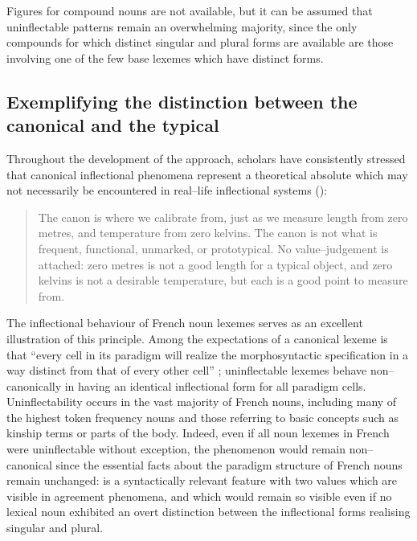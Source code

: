 \documentclass[output=paper,colorlinks,citecolor=brown]{langscibook}
\begin{document}
Figures for compound nouns are not available, but it can be assumed that uninflectable patterns remain an overwhelming majority, since the only compounds for which distinct singular and plural forms are available are those involving one of the few base lexemes which have distinct forms.

\subsection{Exemplifying the distinction between the canonical and the typical}

Throughout the development of the  approach, scholars have consistently stressed that canonical inflectional phenomena represent a theoretical absolute which may not necessarily be encountered in real--life inflectional systems (\citealt{corbett2007, corbett2009, corbett2023, brownchumakina2013, corbettfedden2016, audring2019, bond2019}):

\begin{quote}
	The canon is where we calibrate from, just as we measure length from zero metres, and temperature from zero kelvins. The canon is not what is frequent, functional, unmarked, or prototypical. No value--judgement is attached: zero metres is not a good length for a typical object, and zero kelvins is not a desirable temperature, but each is a good point to measure from.
	
	\hfill \citep[188]{corbett2023}
\end{quote}

The inflectional behaviour of French noun lexemes serves as an excellent illustration of this principle. Among the expectations of a canonical lexeme is that ``every cell in its paradigm will realize the morphosyntactic specification in a way distinct from that of every other cell'' \citep[2]{corbett2009}; uninflectable lexemes behave non--canonically in having an identical inflectional form for all paradigm cells. Uninflectability occurs in the vast majority of French nouns, including many of the highest token frequency nouns and those referring to basic concepts such as kinship terms or parts of the body. Indeed, even if all noun lexemes in French were uninflectable without exception, the phenomenon would remain non--canonical since the essential facts about the paradigm structure of French nouns remain unchanged:  is a syntactically relevant feature with two values which are visible in agreement phenomena, and which would remain so visible even if no lexical noun exhibited an overt distinction between the inflectional
forms realising singular and plural.
\end{document}
